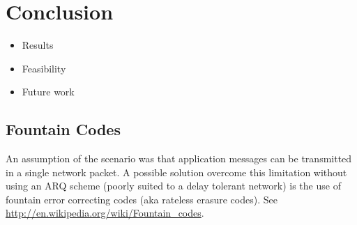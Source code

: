 \chapter{Conclusion} 

\begin{itemize}
\item Results
\item Feasibility
\item Future work
\end{itemize}

\section{Fountain Codes}
\label{sec:fountain_codes}

An assumption of the scenario was that application messages can be transmitted in a single network packet.
A possible solution overcome this limitation without using an ARQ scheme (poorly suited to a delay tolerant network) is the use of fountain error correcting codes (aka rateless erasure codes). 
See \url{http://en.wikipedia.org/wiki/Fountain_codes}.